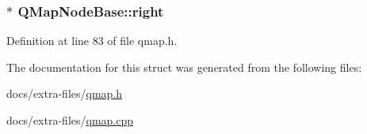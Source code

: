 \subsubsection[{\texorpdfstring{right}{right}}]{$\ast$ Q\+Map\+Node\+Base\+::right}\hypertarget{struct_q_map_node_base_a8eae5d979c668347872c31b956626a68}{}\label{struct_q_map_node_base_a8eae5d979c668347872c31b956626a68}


Definition at line 83 of file qmap.\+h.



The documentation for this struct was generated from the following files\+:\begin{DoxyCompactItemize}
\item 
docs/extra-\/files/\hyperlink{qmap_8h}{qmap.\+h}\item 
docs/extra-\/files/\hyperlink{qmap_8cpp}{qmap.\+cpp}\end{DoxyCompactItemize}
